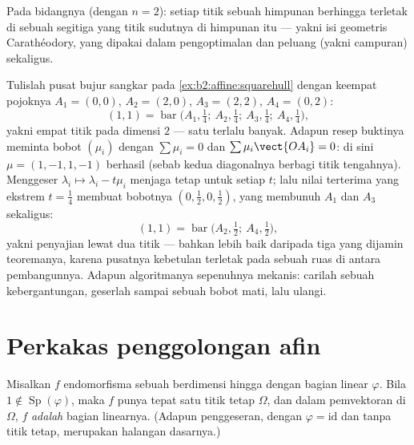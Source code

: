 \begin{example}
Pada bidangnya (dengan $n = 2$): setiap titik  sebuah himpunan
berhingga terletak di sebuah segitiga yang titik sudutnya di himpunan itu --- yakni isi
geometris Carathéodory, yang dipakai dalam pengoptimalan dan peluang
(yakni campuran) sekaligus.
\end{example}

\begin{example}\label{ex:b2:affine:caratheodoryrun}
Tulislah pusat bujur sangkar pada
\cref{ex:b2:affine:squarehull} dengan keempat pojoknya $A_1 =
(0,0)$, $A_2 = (2,0)$, $A_3 = (2,2)$, $A_4 = (0,2)$:
\[
(1,1) = \operatorname{bar}\bigl(A_1, \tfrac14;\ A_2,
\tfrac14;\ A_3, \tfrac14;\ A_4, \tfrac14\bigr),
\]
yakni empat titik pada dimensi $2$ --- satu terlalu banyak. Adapun resep
buktinya meminta bobot $(\mu_i)$ dengan $\sum\mu_i = 0$ dan
$\sum\mu_i\vect{OA_i} = 0$: di sini $\mu = (1, -1, 1, -1)$ berhasil
(sebab kedua diagonalnya berbagi titik tengahnya). Menggeser $\lambda_i
\mapsto \lambda_i - t\mu_i$ menjaga  tetap untuk
setiap $t$; lalu nilai terterima yang ekstrem $t = \frac14$ membuat
bobotnya $(0, \tfrac12, 0, \tfrac12)$, yang membunuh $A_1$ dan
$A_3$ sekaligus:
\[
(1,1) = \operatorname{bar}\bigl(A_2, \tfrac12;\ A_4,
\tfrac12\bigr),
\]
yakni penyajian lewat dua titik --- bahkan lebih baik daripada tiga
yang dijamin teoremanya, karena pusatnya kebetulan
terletak pada sebuah ruas di antara pembangunnya. Adapun algoritmanya
sepenuhnya mekanis: carilah sebuah kebergantungan, geserlah sampai sebuah bobot
mati, lalu ulangi.
\end{example}

\section{Perkakas penggolongan afin}

\begin{proposition}\label{prop:b2:affine:fixedpoint}
Misalkan $f$ endomorfisma  sebuah  berdimensi
hingga dengan bagian linear $\varphi$. Bila $1 \notin
\operatorname{Sp}(\varphi)$, maka $f$ punya tepat satu titik tetap
$\Omega$, dan dalam pemvektoran di $\Omega$, $f$ \emph{adalah}
bagian linearnya. (Adapun penggeseran, dengan $\varphi = \mathrm{id}$ dan tanpa
titik tetap, merupakan halangan dasarnya.)
\end{proposition}

